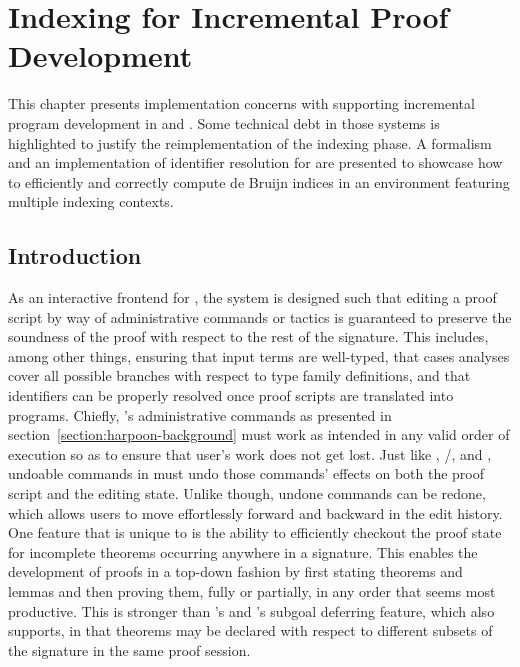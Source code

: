 \chapter{Indexing for Incremental Proof Development}\label{chapter:indexing-reimplementation}

This chapter presents implementation concerns with supporting incremental program development in \Beluga and \Harpoon.
Some technical debt in those systems is highlighted to justify the reimplementation of the indexing phase.
A formalism and an implementation of identifier resolution for \Beluga are presented to showcase how to efficiently and correctly compute de Bruijn indices in an environment featuring multiple indexing contexts.

\section{Introduction}\label{section:indexing-introduction}


As an interactive frontend for \Beluga, the \Harpoon system is designed such that editing a proof script by way of administrative commands or tactics is guaranteed to preserve the soundness of the proof with respect to the rest of the \Beluga signature.
This includes, among other things, ensuring that input terms are well-typed, that cases analyses cover all possible branches with respect to type family definitions, and that identifiers can be properly resolved once proof scripts are translated into programs.
Chiefly, \Harpoon's administrative commands as presented in section~\ref{section:harpoon-background} must work as intended in any valid order of execution so as to ensure that user's work does not get lost.
Just like \Abella, \Isabelle/\Isar, \Coq and \Agda, undoable commands in \Harpoon must undo those commands' effects on both the proof script and the editing state.
Unlike \Abella though, undone commands can be redone, which allows users to move effortlessly forward and backward in the edit history.
One feature that is unique to \Harpoon is the ability to efficiently checkout the proof state for incomplete theorems occurring anywhere in a \Beluga signature.
This enables the development of proofs in a top-down fashion by first stating theorems and lemmas and then proving them, fully or partially, in any order that seems most productive.
This is stronger than \Abella's and \Coq's subgoal deferring feature, which \Harpoon also supports, in that theorems may be declared with respect to different subsets of the signature in the same proof session.

